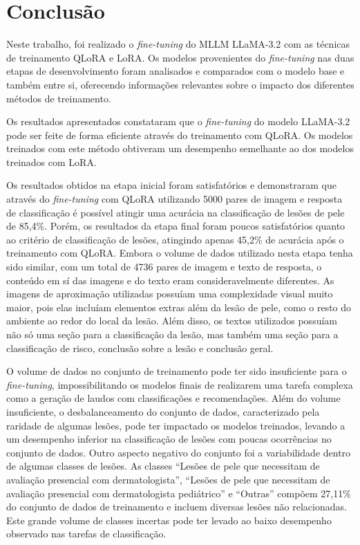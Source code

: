 \chapter{Conclusão}

Neste trabalho, foi realizado o \textit{fine-tuning} do \ac{MLLM} \ac{LLaMA}-3.2 com as técnicas de treinamento
\ac{QLoRA} e \ac{LoRA}. Os modelos provenientes do \textit{fine-tuning} nas duas etapas de desenvolvimento foram
analisados e comparados com o modelo base e também entre si, oferecendo informações relevantes sobre o impacto dos
diferentes métodos de treinamento.

Os resultados apresentados constataram que o \textit{fine-tuning} do modelo \ac{LLaMA}-3.2 pode ser feite de forma
eficiente através do treinamento com \ac{QLoRA}. Os modelos treinados com este método obtiveram um desempenho
semelhante ao dos modelos treinados com \ac{LoRA}.

Os resultados obtidos na etapa inicial foram satisfatórios e demonstraram que através do \textit{fine-tuning} com
\ac{QLoRA} utilizando 5000 pares de imagem e resposta de classificação é possível atingir uma acurácia na classificação
de lesões de pele de 85,4\%. Porém, os resultados da etapa final foram poucos satisfatórios quanto ao critério de
classificação de lesões, atingindo apenas 45,2\% de acurácia após o treinamento com \ac{QLoRA}. Embora o volume de
dados utilizado nesta etapa tenha sido similar, com um total de 4736 pares de imagem e texto de resposta, o conteúdo em
sí das imagens e do texto eram consideravelmente diferentes. As imagens de aproximação utilizadas possuíam uma
complexidade visual muito maior, pois elas incluíam elementos extras além da lesão de pele, como o resto do ambiente ao
redor do local da lesão. Além disso, os textos utilizados possuíam não só uma seção para a classificação da lesão, mas
também uma seção para a classificação de risco, conclusão sobre a lesão e conclusão geral.

O volume de dados no conjunto de treinamento pode ter sido insuficiente para o \textit{fine-tuning}, impossibilitando
os modelos finais de realizarem uma tarefa complexa como a geração de laudos com classificações e recomendações. Além
do volume insuficiente, o desbalanceamento do conjunto de dados, caracterizado pela raridade de algumas lesões, pode
ter impactado os modelos treinados, levando a um desempenho inferior na classificação de lesões com poucas ocorrências
no conjunto de dados. Outro aspecto negativo do conjunto foi a variabilidade dentro de algumas classes de lesões. As
classes ``Lesões de pele que necessitam de avaliação presencial com dermatologista'', ``Lesões de pele que necessitam
de avaliação presencial com dermatologista pediátrico'' e ``Outras'' compõem 27,11\% do conjunto de dados de
treinamento e incluem diversas lesões não relacionadas. Este grande volume de classes incertas pode ter levado ao baixo
desempenho observado nas tarefas de classificação.

